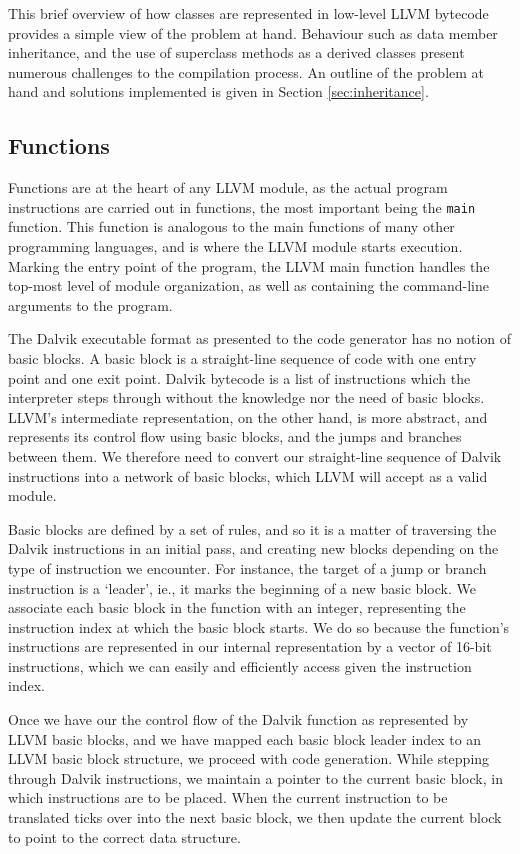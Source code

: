 This brief overview of how classes are represented in low-level LLVM bytecode provides a simple view of the problem at hand. Behaviour such as data member inheritance, and the use of superclass methods as a derived classes present numerous challenges to the compilation process. An outline of the problem at hand and solutions implemented is given in Section \ref{sec:inheritance}.

\subsection*{Functions}

Functions are at the heart of any LLVM module, as the actual program instructions are carried out in functions, the most important being the \verb|main| function. This function is analogous to the main functions of many other programming languages, and is where the LLVM module starts execution. Marking the entry point of the program, the LLVM main function handles the top-most level of module organization, as well as containing the command-line arguments to the program.

The Dalvik executable format as presented to the code generator has no notion of basic blocks. A basic block is a straight-line sequence of code with one entry point and one exit point. Dalvik bytecode is a list of instructions which the interpreter steps through without the knowledge nor the need of basic blocks. LLVM's intermediate representation, on the other hand, is more abstract, and represents its control flow using basic blocks, and the jumps and branches between them. We therefore need to convert our straight-line sequence of Dalvik instructions into a network of basic blocks, which LLVM will accept as a valid module.

Basic blocks are defined by a set of rules, and so it is a matter of traversing the Dalvik instructions in an initial pass, and creating new blocks depending on the type of instruction we encounter. For instance, the target of a jump or branch instruction is a `leader', ie., it marks the beginning of a new basic block. We associate each basic block in the function with an integer, representing the instruction index at which the basic block starts. We do so because the function's instructions are represented in our internal representation by a vector of 16-bit instructions, which we can easily and efficiently access given the instruction index. 

Once we have our the control flow of the Dalvik function as represented by LLVM basic blocks, and we have mapped each basic block leader index to an LLVM basic block structure, we proceed with code generation. While stepping through Dalvik instructions, we maintain a pointer to the current basic block, in which instructions are to be placed. When the current instruction to be translated ticks over into the next basic block, we then update the current block to point to the correct data structure.

